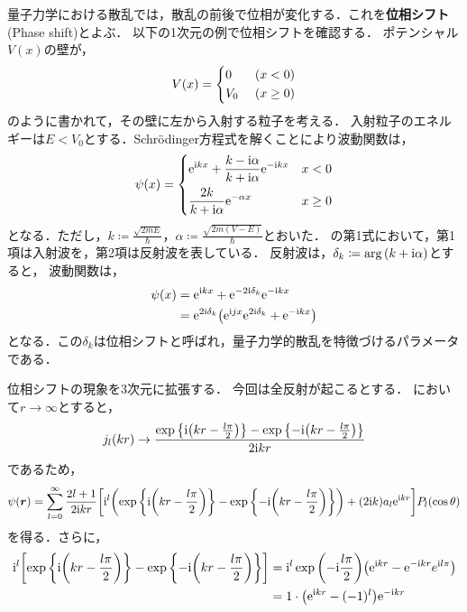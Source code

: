 \documentclass{report}
\begin{document}
  量子力学における散乱では，散乱の前後で位相が変化する．これを\textbf{位相シフト}(Phase shift)とよぶ．
  以下の1次元の例で位相シフトを確認する．
  ポテンシャル$V(x)$の壁が，
  \begin{align}
    V(x) = 
    \begin{dcases}
      0\ &(x < 0) \\
      V_0\ &(x \geq 0)
    \end{dcases}
  \end{align}
  のように書かれて，その壁に左から入射する粒子を考える．
  入射粒子のエネルギーは$E<V_0$とする．Schrödinger方程式を解くことにより波動関数は，
  \begin{align}
    \psi(x) = 
    \begin{dcases}
      \mathrm{e}^{\mathrm{i} kx} + \frac{k -\mathrm{i}\alpha}{k + \mathrm{i}\alpha} \mathrm{e}^{-\mathrm{i} kx} & x < 0 \label{1Dscattering} \\
      \frac{2k}{k + \mathrm{i}\alpha}\mathrm{e}^{-\alpha x} & x \geq 0
    \end{dcases}
  \end{align}
  となる．ただし，$k \coloneqq \frac{\sqrt{2mE}}{\hbar}$，$\alpha \coloneqq \frac{\sqrt{2m(V - E)}}{\hbar}$とおいた．
  の第1式において，第1項は入射波を，第2項は反射波を表している．
  反射波は，$\delta_k \coloneqq \arg\qty(k + \mathrm{i}\alpha)$とすると，
  波動関数は，
  \begin{align}
    \psi(x) &= \mathrm{e}^{\mathrm{i} kx} + \mathrm{e}^{-2 \mathrm{i} \delta_k}\mathrm{e}^{-\mathrm{i} kx} \\ 
    &= \mathrm{e}^{2\mathrm{i}\delta_k}\qty(\mathrm{e}^{\mathrm{i} jx}\mathrm{e}^{2\mathrm{i}\delta_k} + \mathrm{e}^{-\mathrm{i} kx})
  \end{align}
  となる．この$\delta_k$は位相シフトと呼ばれ，量子力学的散乱を特徴づけるパラメータである．
  \par
  位相シフトの現象を3次元に拡張する．
  今回は全反射が起こるとする．
  において$r\to\infty$とすると，
  \begin{align}
    j_l(kr) \to \frac{\exp\qty{\mathrm{i}\qty(kr - \frac{l\pi}{2})} - \exp\qty{-\mathrm{i}\qty(kr - \frac{l\pi}{2})}}{2\mathrm{i} kr}
  \end{align}
  であるため，
  \begin{align}
    \psi(\bm{r}) = \sum_{l = 0}^{\infty} \frac{2l + 1}{2\mathrm{i} kr}\qty[\mathrm{i}^l \qty(\exp\qty{\mathrm{i}\qty(kr - \frac{l\pi}{2})} - \exp\qty{-\mathrm{i}\qty(kr - \frac{l\pi}{2})}) + (2\mathrm{i} k) a_l \mathrm{e}^{\mathrm{i} kr}]P_l(\cos\theta)
  \end{align}
  を得る．さらに，
  \begin{align}
    \mathrm{i}^l \qty[\exp\qty{\mathrm{i}\qty(kr - \frac{l\pi}{2})} - \exp\qty{-\mathrm{i}\qty(kr - \frac{l\pi}{2})}] &= \mathrm{i}^l \exp\qty(-\mathrm{i}\frac{l\pi}{2})\qty(\mathrm{e}^{\mathrm{i} kr} - \mathrm{e}^{-\mathrm{i} kr} e^{\mathrm{i} l\pi}) \\
    &= 1\cdot\qty(\mathrm{e}^{\mathrm{i} kr} - (-1)^l) \mathrm{e}^{-\mathrm{i} kr}
  \end{align}
\end{document}
